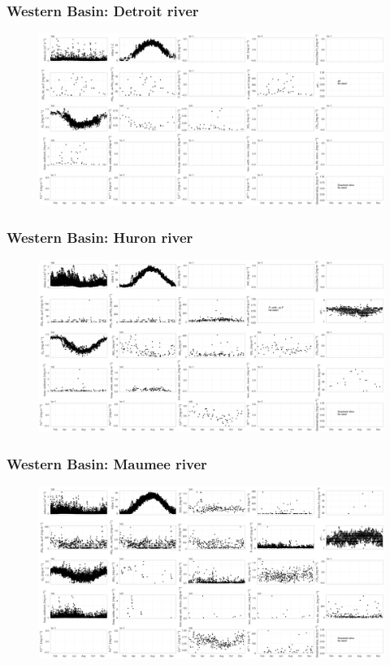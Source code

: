 \documentclass{beamer}
\begin{document}
\begin{frame}
\frametitle{Western Basin: Detroit river}
\begin{figure}
\includegraphics[width=\textwidth]{rivers/Western basin/plot_1yr detroitriver.png}
\end{figure}
\end{frame}


\begin{frame}
\frametitle{Western Basin: Huron river}
\begin{figure}
\includegraphics[width=\textwidth]{rivers/Western basin/plot_1yr huronriver.png}
\end{figure}
\end{frame}


\begin{frame}
\frametitle{Western Basin: Maumee river}
\begin{figure}
\includegraphics[width=\textwidth]{rivers/Western basin/plot_1yr maumeeriver.png}
\end{figure}
\end{frame}
\end{document}
